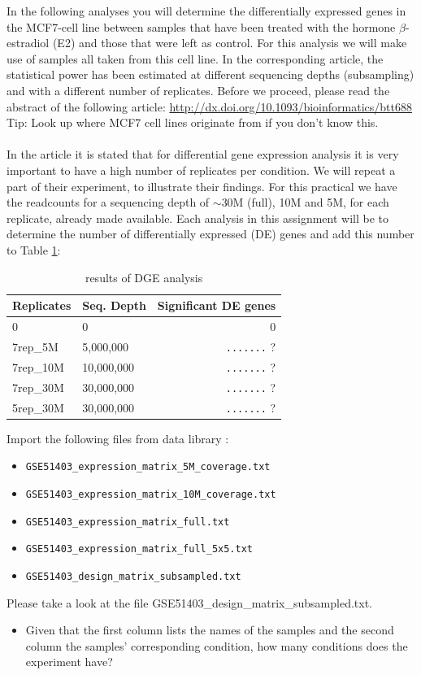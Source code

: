 \documentclass[11pt,a4paper]{article}
\begin{document}
In the following analyses you will determine the differentially expressed genes in the MCF7-cell line between samples that have been treated with the hormone $\beta$-estradiol (E2) and those that were left as control. For this analysis we will make use of samples all taken from this cell line. In the corresponding article, the statistical power has been estimated at different sequencing depths (subsampling) and with a different number of replicates. Before we proceed, please read the abstract of the following article:
\url{http://dx.doi.org/10.1093/bioinformatics/btt688}\\
Tip: Look up where MCF7 cell lines originate from if you don't know this.\\
\\
In the article it is stated that for differential gene expression analysis it is very important to have a high number of replicates per condition. We will repeat a part of their experiment, to illustrate their findings. For this practical we have the readcounts for a sequencing depth of $\sim$30M (full), 10M and 5M, for each replicate, already made available. Each analysis in this assignment
will be to determine the number of differentially expressed (DE) genes and add this number to Table \ref{tab:dge_ad_01}:
\begin{table}[]
\centering
\caption{results of DGE analysis}
\label{tab:dge_ad_01}
\begin{tabular}{ | l | l | r | }
\hline
Replicates & Seq. Depth & Significant DE genes \\
\hline
0          & 0          & 0\quad\quad \\
7rep\_5M   & 5,000,000  & \verb|.......| ? \\
7rep\_10M  & 10,000,000 & \verb|.......| ? \\
7rep\_30M  & 30,000,000 & \verb|.......| ? \\
5rep\_30M  & 30,000,000 & \verb|.......| ? \\
\hline
\end{tabular}
\end{table}
Import the following files from data library \datalibrarydirrnaseqadvanced :
\begin{itemize}
	\item[] \verb|GSE51403_expression_matrix_5M_coverage.txt|
	\item[] \verb|GSE51403_expression_matrix_10M_coverage.txt|
	\item[] \verb|GSE51403_expression_matrix_full.txt|
	\item[] \verb|GSE51403_expression_matrix_full_5x5.txt|
	\item[] \verb|GSE51403_design_matrix_subsampled.txt|
\end{itemize}
Please take a look at the file GSE51403\_design\_matrix\_subsampled.txt.
\begin{itemize}
	\item Given that the first column lists the names of the samples and the second column the samples' corresponding condition, how many conditions does the experiment have?
\end{itemize}
\end{document}
